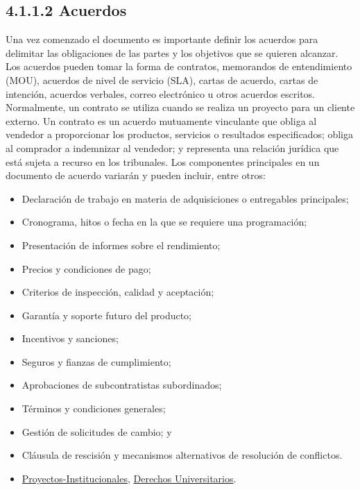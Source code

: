 \documentclass[letterpaper,12pt,openright,oneside]{article}
\theoremstyle{plain}
\begin{document}
\subsection*{4.1.1.2 Acuerdos}

Una vez comenzado el documento es importante definir los acuerdos para delimitar las obligaciones de las partes y los objetivos que se quieren alcanzar.
Los acuerdos pueden tomar la forma de contratos, memorandos de entendimiento (MOU), acuerdos de nivel de servicio (SLA), cartas de acuerdo, cartas de intención, acuerdos verbales, correo electrónico u otros acuerdos escritos. Normalmente, un contrato se utiliza cuando se realiza un proyecto para un cliente externo.
Un contrato es un acuerdo mutuamente vinculante que obliga al vendedor a proporcionar los productos, servicios o resultados especificados; obliga al comprador a indemnizar al vendedor; y representa una relación jurídica que está sujeta a recurso en los tribunales. Los componentes principales en un documento de acuerdo variarán y pueden incluir, entre otros: 

\begin{itemize}
    \item Declaración de trabajo en materia de adquisiciones o entregables principales;
    \item Cronograma, hitos o fecha en la que se requiere una programación;
    \item Presentación de informes sobre el rendimiento;
    \item Precios y condiciones de pago;
    \item Criterios de inspección, calidad y aceptación;
    \item Garantía y soporte futuro del producto;
    \item Incentivos y sanciones;
    \item Seguros y fianzas de cumplimiento;
    \item Aprobaciones de subcontratistas subordinados;
    \item Términos y condiciones generales;
    \item Gestión de solicitudes de cambio; y
    \item Cláusula de rescisión y mecanismos alternativos de resolución de conflictos.
    \item \href{https://www.uaq.mx/index.php/conocenos/rectoria/67-conocenos/350-proyectos-institucionales}{Proyectos-Institucionales}, \href{https://derechosuniversitarios.uaq.mx/}{Derechos Universitarios}.
\end{itemize}
\end{document}
